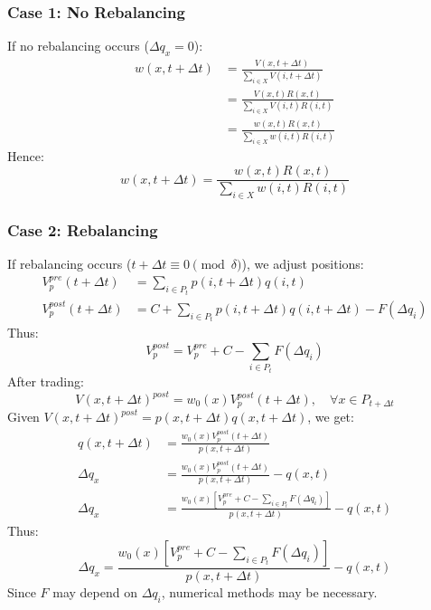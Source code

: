 \documentclass[12pt]{article}
\begin{document}
\subsubsection{Case 1: No Rebalancing}
If no rebalancing occurs ($ \Delta q_x = 0 $):
\begin{align}
w(x, t + \Delta t)
&= \frac{V(x,t + \Delta t)}{\sum_{i \in X} V(i, t + \Delta t)} \nonumber\\
&= \frac{V(x,t)R(x,t)}{\sum_{i \in X} V(i,t)R(i,t)} \nonumber\\
&= \frac{w(x,t)R(x,t)}{\sum_{i \in X} w(i,t) R(i,t)}
\label{eq:weight_evolution}
\end{align}
Hence:
\begin{equation}
\boxed{w(x, t + \Delta t) = \frac{w(x,t)R(x,t)}{\sum_{i \in X} w(i,t) R(i,t)}}
\end{equation}

\subsubsection{Case 2: Rebalancing}
If rebalancing occurs ($ t + \Delta t \equiv 0 \pmod{\delta} $), we adjust positions:
\begin{align}
V_p^{pre}(t + \Delta t) &= \sum_{i \in P_t} p(i, t + \Delta t)q(i, t) \label{eq:vpre}\\
V_p^{post}(t + \Delta t) &= C + \sum_{i \in P_t} p(i, t + \Delta t)q(i, t + \Delta t) - F(\Delta q_i)
\label{eq:vpost}
\end{align}
Thus:
\begin{equation}
V_p^{post} = V_p^{pre} + C - \sum_{i \in P_t}F(\Delta q_i)
\label{eq:vpost_balance}
\end{equation}
After trading:
\begin{equation}
V(x,t + \Delta t)^{post} = w_0(x) V_p^{post}(t + \Delta t), \quad \forall x \in P_{t + \Delta t}
\label{eq:post_value}
\end{equation}
Given $ V(x, t + \Delta t)^{post} = p(x, t + \Delta t)q(x, t + \Delta t) $, we get:
\begin{align}
q(x, t + \Delta t) &=  \frac{w_0(x) V_p^{post}(t + \Delta t)}{p(x, t + \Delta t)} \label{eq:q_post}\\
\Delta q_x &=  \frac{w_0(x) V_p^{post}(t + \Delta t)}{p(x, t + \Delta t)} - q(x, t) \label{eq:dq_general}\\
\Delta q_x &=  \frac{w_0(x)[V_p^{pre} + C - \sum_{i \in P_t}F(\Delta q_i)]}{p(x, t + \Delta t)} - q(x, t)
\label{eq:dq_implicit}
\end{align}
Thus:
\begin{equation}
\boxed{\Delta q_x =  \frac{w_0(x)[V_p^{pre} + C - \sum_{i \in P_t}F(\Delta q_i)]}{p(x, t + \Delta t)} - q(x, t)}
\label{eq:dq_box}
\end{equation}
Since $ F $ may depend on $ \Delta q_i $, numerical methods may be necessary.
\end{document}
